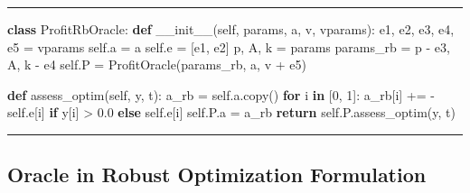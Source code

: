 \documentclass[
]{article}
\newenvironment{Shaded}{}{}
\newcommand{\ControlFlowTok}[1]{\textcolor[rgb]{0.00,0.44,0.13}{\textbf{#1}}}
\newcommand{\DecValTok}[1]{\textcolor[rgb]{0.25,0.63,0.44}{#1}}
\newcommand{\FloatTok}[1]{\textcolor[rgb]{0.25,0.63,0.44}{#1}}
\newcommand{\FunctionTok}[1]{\textcolor[rgb]{0.02,0.16,0.49}{#1}}
\newcommand{\KeywordTok}[1]{\textcolor[rgb]{0.00,0.44,0.13}{\textbf{#1}}}
\newcommand{\NormalTok}[1]{#1}
\newcommand{\OperatorTok}[1]{\textcolor[rgb]{0.40,0.40,0.40}{#1}}
\newcommand{\VariableTok}[1]{\textcolor[rgb]{0.10,0.09,0.49}{#1}}
\begin{document}
\begin{center}\rule{0.5\linewidth}{0.5pt}\end{center}

\begin{Shaded}
\begin{Highlighting}[]
\KeywordTok{class}\NormalTok{ ProfitRbOracle:}
    \KeywordTok{def} \FunctionTok{\_\_init\_\_}\NormalTok{(}\VariableTok{self}\NormalTok{, params, a, v, vparams):}
\NormalTok{        e1, e2, e3, e4, e5 }\OperatorTok{=}\NormalTok{ vparams}
        \VariableTok{self}\NormalTok{.a }\OperatorTok{=}\NormalTok{ a}
        \VariableTok{self}\NormalTok{.e }\OperatorTok{=}\NormalTok{ [e1, e2]}
\NormalTok{        p, A, k }\OperatorTok{=}\NormalTok{ params}
\NormalTok{        params\_rb }\OperatorTok{=}\NormalTok{ p }\OperatorTok{{-}}\NormalTok{ e3, A, k }\OperatorTok{{-}}\NormalTok{ e4}
        \VariableTok{self}\NormalTok{.P }\OperatorTok{=}\NormalTok{ ProfitOracle(params\_rb, a, v }\OperatorTok{+}\NormalTok{ e5)}

    \KeywordTok{def}\NormalTok{ assess\_optim(}\VariableTok{self}\NormalTok{, y, t):}
\NormalTok{        a\_rb }\OperatorTok{=} \VariableTok{self}\NormalTok{.a.copy()}
        \ControlFlowTok{for}\NormalTok{ i }\KeywordTok{in}\NormalTok{ [}\DecValTok{0}\NormalTok{, }\DecValTok{1}\NormalTok{]:}
\NormalTok{            a\_rb[i] }\OperatorTok{+=} \OperatorTok{{-}}\VariableTok{self}\NormalTok{.e[i] }\ControlFlowTok{if}\NormalTok{ y[i] }\OperatorTok{\textgreater{}} \FloatTok{0.0} \ControlFlowTok{else} \VariableTok{self}\NormalTok{.e[i]}
        \VariableTok{self}\NormalTok{.P.a }\OperatorTok{=}\NormalTok{ a\_rb}
        \ControlFlowTok{return} \VariableTok{self}\NormalTok{.P.assess\_optim(y, t)}
\end{Highlighting}
\end{Shaded}

\begin{center}\rule{0.5\linewidth}{0.5pt}\end{center}

\subsection{Oracle in Robust Optimization
Formulation}\label{oracle-in-robust-optimization-formulation}
\end{document}

